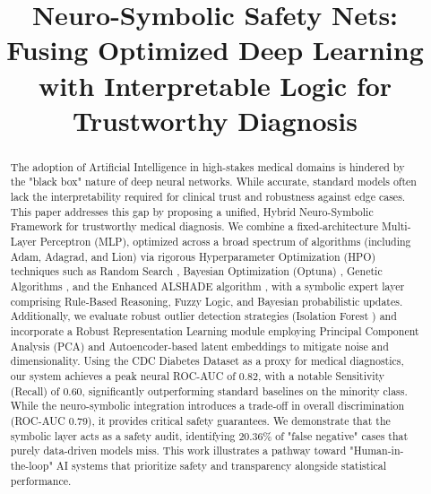 \documentclass[conference]{IEEEtran}
\begin{document}
\title{Neuro-Symbolic Safety Nets: Fusing Optimized Deep Learning with Interpretable Logic for Trustworthy Diagnosis}

\author{
}

\maketitle

\begin{abstract}
 The adoption of Artificial Intelligence in high-stakes medical domains is hindered by the "black box" nature of deep neural networks. While accurate, standard models often lack the interpretability required for clinical trust and robustness against edge cases. This paper addresses this gap by proposing a unified, Hybrid Neuro-Symbolic Framework for trustworthy medical diagnosis. We combine a fixed-architecture Multi-Layer Perceptron (MLP), optimized across a broad spectrum of algorithms (including Adam, Adagrad, and Lion) via rigorous Hyperparameter Optimization (HPO) techniques such as Random Search \cite{javeed2019random}, Bayesian Optimization (Optuna) \cite{hariharan2025optuna}, Genetic Algorithms \cite{lambora2019ga}, and the Enhanced ALSHADE algorithm \cite{karpinski2025deullm}, with a symbolic expert layer comprising Rule-Based Reasoning, Fuzzy Logic, and Bayesian probabilistic updates. Additionally, we evaluate robust outlier detection strategies (Isolation Forest \cite{cheng2019iforest}) and incorporate a Robust Representation Learning module employing Principal Component Analysis (PCA) and Autoencoder-based latent embeddings to mitigate noise and dimensionality. Using the CDC Diabetes Dataset as a proxy for medical diagnostics, our system achieves a peak neural ROC-AUC of 0.82, with a notable Sensitivity (Recall) of 0.60, significantly outperforming standard baselines on the minority class. While the neuro-symbolic integration introduces a trade-off in overall discrimination (ROC-AUC 0.79), it provides critical safety guarantees. We demonstrate that the symbolic layer acts as a safety audit, identifying 20.36\% of "false negative" cases that purely data-driven models miss. This work illustrates a pathway toward "Human-in-the-loop" AI systems that prioritize safety and transparency alongside statistical performance.
\end{abstract}
\end{document}
